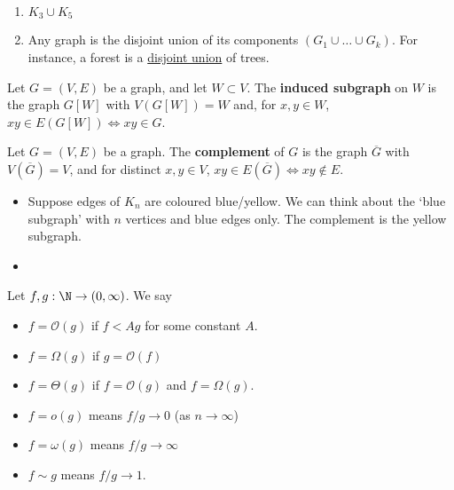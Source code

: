 \documentclass{article}
\begin{document}
\begin{eg}
    \leavevmode
    \begin{enumerate}
        \item $K_3 \cup K_5$ %
        \item Any graph is the disjoint union of its components $(G_1 \cup \dots \cup G_k)$.
            For instance, a forest is a \hyperlink{def:disUnion}{disjoint union} of trees.
    \end{enumerate}
\end{eg}

\begin{defi}
    Let $G = (V, E)$ be a graph, and let $W \subset V$. The \textbf{induced subgraph} on $W$ is the graph $G[W]$ with $V(G[W]) = W$ and, for $x,y \in W$, $xy \in E(G[W]) \iff xy \in G$.
\end{defi}

\begin{defi}
    Let $G = (V, E)$ be a graph. The \textbf{complement} of $G$ is the graph $\overline{G}$ with $V(\overline{G}) = V$, and for distinct $x, y \in V$, $xy \in E(\overline{G}) \iff xy \notin E$.
\end{defi}

\begin{eg}
    \leavevmode
    \begin{itemize}
        \item Suppose edges of $K_n$ are coloured blue/yellow. We can think about the `blue subgraph' with $n$ vertices and blue edges only. The complement is the yellow subgraph.
        \item %
    \end{itemize}
\end{eg}

\begin{notation}
    Let $f, g: \N \to (0, \infty)$.
    We say
    \begin{itemize}[label={--}]
        \item $f = \mathcal{O}(g)$ if $f < A g$ for some constant $A$.
        \item $f = \Omega(g)$ if $g = \mathcal{O}(f)$
        \item $f = \Theta(g)$ if $f = \mathcal{O}(g)$ and $f = \Omega(g)$.

        \item $f = o(g)$ means $f/g \to 0$ (as $n \to \infty$)
        \item $f = \omega(g)$ means $f/g \to \infty$
        \item $f \sim g$ means $f/g \to 1$.
    \end{itemize}
\end{notation}
\end{document}
